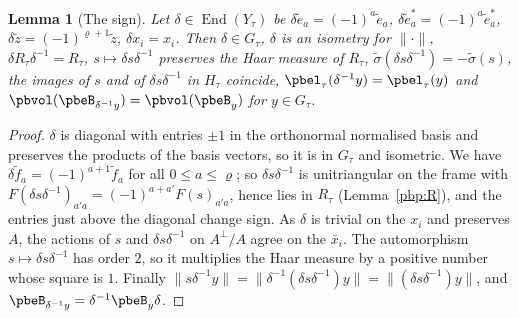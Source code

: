 \documentclass[10pt]{amsart}
\newtheorem{lemma}[theorem]{Lemma}
\theoremstyle{definition}
\theoremstyle{remark}
\begin{document}
\begin{lemma}[The sign]\label{pbp:sign}
Let $\delta\in\operatorname{End}(Y_\tau)$ be $\delta\tilde e_a=(-1)^a\tilde e_a$, $\delta\tilde e_a^*=
(-1)^a\tilde e_a^*$, $\delta\tilde z=(-1)^{\varrho+1}\tilde z$, $\delta x_i=x_i$. Then $\delta\in G_\tau$,
$\delta$ is an isometry for $\|\cdot\|$, $\delta R_\tau\delta^{-1}=R_\tau$, $s\mapsto\delta s\delta^{-1}$
preserves the Haar measure of $R_\tau$, $\tilde\sigma(\delta s\delta^{-1})=-\tilde\sigma(s)$, the
images of $s$ and of $\delta s\delta^{-1}$ in $H_\tau$ coincide, $\pbel_\tau(\delta^{-1}y)=\pbel_\tau(y)$
and $\pbvol(\pbeB_{\delta^{-1}y})=\pbvol(\pbeB_y)$ for $y\in G_\tau$.
\end{lemma}
\begin{proof}
$\delta$ is diagonal with entries $\pm1$ in the orthonormal normalised basis and preserves the
products of the basis vectors, so it is in $G_\tau$ and isometric. We have $\delta\tilde f_a=
(-1)^{a+1}\tilde f_a$ for all $0\le a\le\varrho$; so $\delta s\delta^{-1}$ is unitriangular on the frame
with $F(\delta s\delta^{-1})_{a'a}=(-1)^{a+a'}F(s)_{a'a}$, hence lies in $R_\tau$
(Lemma~\ref{pbp:R}), and the entries just above the diagonal change sign. As $\delta$ is trivial on
the $x_i$ and preserves $A$, the actions of $s$ and $\delta s\delta^{-1}$ on $A^\perp/A$ agree on the
$\bar x_i$. The automorphism $s\mapsto\delta s\delta^{-1}$ has order $2$, so it multiplies the Haar
measure by a positive number whose square is $1$. Finally $\|s\delta^{-1}y\|=\|\delta^{-1}(\delta s
\delta^{-1})y\|=\|(\delta s\delta^{-1})y\|$, and $\pbeB_{\delta^{-1}y}=\delta^{-1}\pbeB_y\delta$.
\end{proof}
\end{document}
